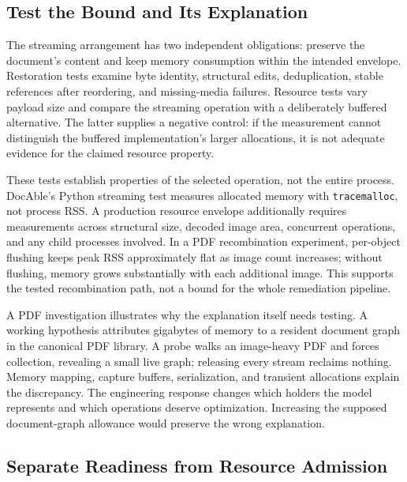 \subsection*{Test the Bound and Its Explanation}

The streaming arrangement has two independent obligations: preserve the document's content and keep memory consumption within the intended envelope. Restoration tests examine byte identity, structural edits, deduplication, stable references after reordering, and missing-media failures. Resource tests vary payload size and compare the streaming operation with a deliberately buffered alternative. The latter supplies a negative control: if the measurement cannot distinguish the buffered implementation's larger allocations, it is not adequate evidence for the claimed resource property.

These tests establish properties of the selected operation, not the entire process. DocAble's Python streaming test measures allocated memory with \texttt{tracemalloc}, not process RSS. A production resource envelope additionally requires measurements across structural size, decoded image area, concurrent operations, and any child processes involved. In a PDF recombination experiment, per-object flushing keeps peak RSS approximately flat as image count increases; without flushing, memory grows substantially with each additional image. This supports the tested recombination path, not a bound for the whole remediation pipeline.

A PDF investigation illustrates why the explanation itself needs testing. A working hypothesis attributes gigabytes of memory to a resident document graph in the canonical PDF library. A probe walks an image-heavy PDF and forces collection, revealing a small live graph; releasing every stream reclaims nothing. Memory mapping, capture buffers, serialization, and transient allocations explain the discrepancy. The engineering response changes which holders the model represents and which operations deserve optimization. Increasing the supposed document-graph allowance would preserve the wrong explanation.

\subsection*{Separate Readiness from Resource Admission}

